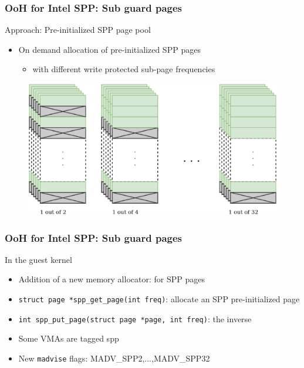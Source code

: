 \documentclass[xcolor=table,bigger,unknownkeysallowed]{beamer}
\begin{document}
        \begin{frame}
        \frametitle{OoH for Intel SPP: Sub guard pages} 
			\begin{block}{Approach: Pre-initialized SPP page pool}			
				\begin{itemize}
					\item On demand allocation of pre-initialized SPP pages
					\begin{itemize}
						\item with different write protected sub-page frequencies
					\end{itemize}
				\end{itemize}
			\end{block}	
 		    \begin{figure}
			\centering
				\includegraphics[width=.6\columnwidth]{fig/pool}
			\end{figure}				
        \end{frame}          
        \begin{frame}
        \frametitle{OoH for Intel SPP: Sub guard pages} 
			\begin{block}{In the guest kernel}			
				\begin{itemize}
					\item Addition of a new memory allocator: for SPP pages
					\item \texttt{struct page *spp\_get\_page(int freq)}: allocate an SPP pre-initialized page
					\item \texttt{int spp\_put\_page(struct page *page, int freq)}: the inverse
					\item Some VMAs are tagged spp
					\item New \texttt{madvise} flags: MADV\_SPP2,...,MADV\_SPP32
				\end{itemize}
			\end{block}					
        \end{frame} 
\end{document}
